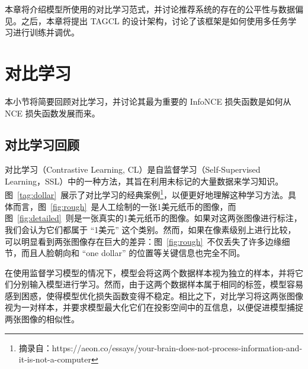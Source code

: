 本章将介绍模型所使用的对比学习范式，并讨论推荐系统的存在的公平性与数据偏见。之后，本章将提出 TAGCL 的设计架构，讨论了该框架是如何使用多任务学习进行训练并调优。

\section{对比学习}
本小节将简要回顾对比学习，并讨论其最为重要的 InfoNCE 损失函数是如何从 NCE 损失函数发展而来。
\subsection{对比学习回顾}
对比学习（Contrastive Learning, CL）是自监督学习（Self-Supervised Learning，SSL）中的一种方法，其旨在利用未标记的大量数据来学习知识。图~\ref{tag:dollar}~展示了对比学习的经典案例\footnote{摘录自：https://aeon.co/essays/your-brain-does-not-process-information-and-it-is-not-a-computer}，以便更好地理解这种学习方法。具体而言，图~\ref{fig:rough}~是人工绘制的一张1美元纸币的图像，而图~\ref{fig:detailed}~则是一张真实的1美元纸币的图像。如果对这两张图像进行标注，我们会认为它们都属于 “1美元” 这个类别。然而，如果在像素级别上进行比较，可以明显看到两张图像存在巨大的差异：图~\ref{fig:rough}~不仅丢失了许多边缘细节，而且人脸朝向和 “one dollar” 的位置等关键信息也完全不同。

在使用监督学习模型的情况下，模型会将这两个数据样本视为独立的样本，并将它们分别输入模型进行学习。然而，由于这两个数据样本属于相同的标签，模型容易感到困惑，使得模型优化损失函数变得不稳定。相比之下，对比学习将这两张图像视为一对样本，并要求模型最大化它们在投影空间中的互信息，以便促进模型捕捉两张图像的相似性。


